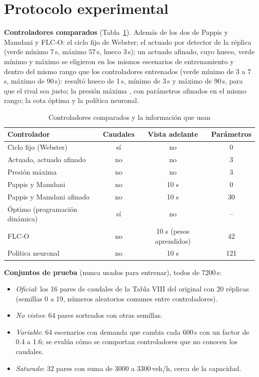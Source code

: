 \documentclass[journal]{IEEEtran}
\newcommand{\fuente}[1]{\par\vspace{3pt}\noindent{\scriptsize\textit{Fuente:} #1\par}}
\newcommand{\FLC}{FLC-O}
\begin{document}
\section{Protocolo experimental}
\label{sec:protocolo}

\textbf{Controladores comparados} (Tabla~\ref{tab:controladores}). Además de los dos de Pappis y Mamdani y \FLC{}: el ciclo fijo de Webster; el actuado por detector de la réplica (verde mínimo 7\,s, máximo 57\,s, hueco 3\,s); un actuado afinado, cuyo hueco, verde mínimo y máximo se eligieron en los mismos escenarios de entrenamiento y dentro del mismo rango que los controladores entrenados (verde mínimo de 3 a 7\,s, máximo de 90\,s): resultó hueco de 1\,s, mínimo de 3\,s y máximo de 90\,s, para que el rival sea justo; la presión máxima \cite{Varaiya2013}, con parámetros afinados en el mismo rango; la cota óptima y la política neuronal.

\begin{table}[t]
\centering
\caption{Controladores comparados y la información que usan}
\label{tab:controladores}
\scriptsize
\setlength{\tabcolsep}{2.5pt}
\begin{tabular}{@{}lccc@{}}
\toprule
Controlador & Caudales & Vista adelante & Parámetros \\
\midrule
Ciclo fijo (Webster) & sí & no & 0 \\
Actuado, actuado afinado & no & no & 3 \\
Presión máxima & no & no & 3 \\
Pappis y Mamdani & no & 10 s & 0 \\
Pappis y Mamdani afinado & no & 10 s & 30 \\
Óptimo (programación dinámica) & sí & no & -- \\
FLC-O & no & 10 s (pesos aprendidos) & 42 \\
Política neuronal & no & 10 s & 121 \\
\bottomrule
\end{tabular}
\fuente{elaboración propia.}
\end{table}

\textbf{Conjuntos de prueba} (nunca usados para entrenar), todos de 7200\,s:
\begin{itemize}
\item \emph{Oficial}: los 16 pares de caudales de la Tabla VIII del original con 20 réplicas (semillas 0 a 19, números aleatorios comunes entre controladores).
\item \emph{No vistos}: 64 pares sorteados con otras semillas.
\item \emph{Variable}: 64 escenarios con demanda que cambia cada 600\,s con un factor de 0.4 a 1.6; se evalúa cómo se comportan controladores que no conocen los caudales.
\item \emph{Saturado}: 32 pares con suma de 3000 a 3300\,veh/h, cerca de la capacidad.
\end{itemize}
\end{document}
